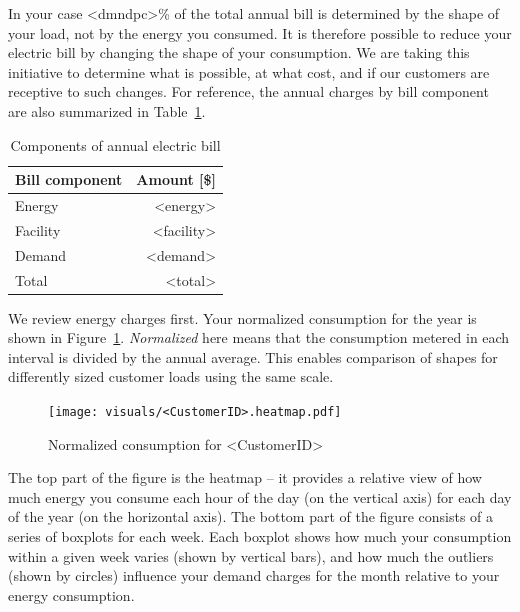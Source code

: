 \documentclass[10pt]{article}
\begin{document}
In your case <dmndpc>\% of the total annual bill is determined by the shape of your load, not by the energy you consumed.
It is therefore possible to reduce your electric bill by changing the shape of your consumption.
We are taking this initiative to determine what is possible, at what cost, and if our customers are receptive to such changes.
For reference, the annual charges by bill component are also summarized in Table~\ref{tab:annual}.

\begin{table}[th!]
  \centering
  \caption{Components of annual electric bill}
  \vspace{1.5ex}
  \label{tab:annual}
  \begin{tabular}{lr}
    Bill component & Amount [\$] \\
    \midrule
    Energy & <energy> \\
    Facility & <facility> \\
    Demand & <demand> \\
    \midrule
    Total & <total>
  \end{tabular}
\end{table}
\clearpage

\pagestyle{energy}

We review energy charges first.
Your normalized consumption for the year is shown in Figure~\ref{fig:heatmap}.
\emph{Normalized} here means that the consumption metered in each interval is divided by the annual average.
This enables comparison of shapes for differently sized customer loads using the same scale.
\begin{figure}[!h]
\centering
\texttt{[image: visuals/<CustomerID>.heatmap.pdf]}
\caption{Normalized consumption for <CustomerID>}
\label{fig:heatmap}
\end{figure}

The top part of the figure is the heatmap -- it provides a relative view of how much energy you consume each hour of the day (on the vertical axis) for each day of the year (on the horizontal axis).
The bottom part of the figure consists of a series of boxplots for each week. 
Each boxplot shows how much your consumption within a given week varies (shown by vertical bars), and how much the outliers (shown by circles) influence your demand charges for the month relative to your energy consumption.
\end{document}
